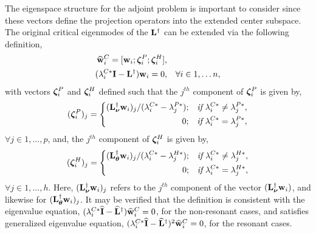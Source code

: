 The eigenspace structure for the adjoint problem is important to consider since these vectors define the projection operators into the extended center subspace. The original critical eigenmodes of the $\mathbf{L}^{\dagger}$ can be extended via the following definition,
\begin{subequations}
	\label{eqn:extended_adjoint_mode} 
	\begin{align}
		\widehat{\mathbf{w}}^{C}_{i} = [
			\mathbf{w}_{i};
			\boldsymbol{\zeta}^{P}_{i};
			\boldsymbol{\zeta}^{H}_{i}
		], && \\
		(\lambda^{C*}_{i}\mathbf{I} - \mathbf{L}^{\dagger})\mathbf{w}_{i} = 0, &&  \forall i \in 1,\ldots n,
	\end{align}
\end{subequations}
with vectors $\boldsymbol{\zeta}^{P}_{i}$ and $\boldsymbol{\zeta}^{H}_{i}$ defined such that the $j^{th}$ component of $\boldsymbol{\zeta}^{P}_{i}$ is given by,
\begin{equation}
	\label{eqn:extended_resonant_adjoint_eigenvector1}
	(\boldsymbol{\zeta}^{P}_{i})_{j} = 
	\left\lbrace
	\begin{split}
		(\mathbf{L}_{\boldsymbol{\nu}}^{\dagger}\mathbf{w}_{i})_{j}/(\lambda^{C*}_{i} - \lambda^{P*}_{j}); && \textit{if}\ \lambda^{C*}_{i} \ne \lambda^{P*}_{j}, \\
		0;		&& \textit{if}\ \lambda^{C*}_{i} = \lambda^{P*}_{j},
	\end{split}\right.
\end{equation}
$\forall j\in 1,\ldots,p$, and, the $j^{th}$ component of $\boldsymbol{\zeta}^{H}_{i}$ is given by,
\begin{equation}
	\label{eqn:extended_resonant_adjoint_eigenvector2}
	(\boldsymbol{\zeta}^{H}_{i})_{j} =
	\left\lbrace
	\begin{split}
		(\mathbf{L}_{\boldsymbol{\theta}}^{\dagger}\mathbf{w}_{i})_{j}/(\lambda^{C*}_{i} - \lambda^{H*}_{j}); && \textit{if}\ \lambda^{C*}_{i} \ne \lambda^{H*}_{j}, \\
		0;		&& \textit{if}\ \lambda^{C*}_{i} = \lambda^{H*}_{j},
	\end{split}\right.
\end{equation}
$\forall j\in 1,\ldots,h$. Here, $(\mathbf{L}_{\boldsymbol{\nu}}^{\dagger}\mathbf{w}_{i})_{j}$ refers to the $j^{th}$ component of the vector $(\mathbf{L}_{\boldsymbol{\nu}}^{\dagger}\mathbf{w}_{i})$, and likewise for $(\mathbf{L}_{\boldsymbol{\theta}}^{\dagger}\mathbf{w}_{i})_{j}$. It may be verified that the definition is consistent with the eigenvalue equation, $(\lambda^{C*}_{i}\mathbf{\widehat{I}} - \mathbf{\widehat{L}}^{\dagger})\widehat{\mathbf{w}}^{C}_{i} = 0$, for the non-resonant cases, and satisfies generalized eigenvalue equation, $(\lambda^{C*}_{i}\mathbf{\widehat{I}} - \mathbf{\widehat{L}}^{\dagger})^{2}\widehat{\mathbf{w}}^{C}_{i} = 0$, for the resonant cases. 

